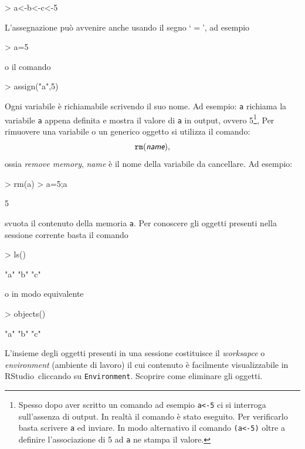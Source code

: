 \documentclass[onecolumn,11pt]{book}
\newcommand{\varia}[1]{\textsl{\textsf{#1}}}
\newcommand{\rst}{\textsf{RStudio}~}
\begin{document}
\begin{Schunk}
\begin{Sinput}
> a<-b<-c<-5 
\end{Sinput}
\end{Schunk}
L'assegnazione pu\`o avvenire anche usando il segno `$=$', ad esempio
\begin{Schunk}
\begin{Sinput}
> a=5 
\end{Sinput}
\end{Schunk}
o il comando
\begin{Schunk}
\begin{Sinput}
> assign("a",5)
\end{Sinput}
\end{Schunk}
Ogni variabile \`e richiamabile scrivendo il suo nome.
Ad esempio:
\texttt{a} richiama la variabile \texttt{a} appena definita e mostra il valore di \texttt{a} in output, ovvero 5\footnote{Spesso 
dopo aver scritto un comando ad esempio \texttt{a<-5} ci si interroga sull'assenza di output. In realt\`a il comando \`e stato eseguito. Per verificarlo basta scrivere \texttt{a} ed inviare. In modo alternativo il comando  \texttt{(a<-5)} oltre a definire l'associazione di 5 ad \texttt{a} ne stampa il valore.},
Per rimuovere una variabile o un generico oggetto si utilizza il comando:
$$\texttt{rm}(\varia{name}),$$
 ossia {\it remove memory}, \varia{name} \`e il nome della variabile da cancellare. Ad  esempio: 
\begin{Schunk}
\begin{Sinput}
> rm(a)
> a=5;a
\end{Sinput}
\begin{Soutput}
[1] 5
\end{Soutput}
\end{Schunk}
svuota il contenuto della memoria \texttt{a}. Per conoscere gli oggetti presenti nella sessione corrente basta il comando
\begin{Schunk}
\begin{Sinput}
> ls()
\end{Sinput}
\begin{Soutput}
[1] "a" "b" "c"
\end{Soutput}
\end{Schunk}
o in modo equivalente
\begin{Schunk}
\begin{Sinput}
> objects()
\end{Sinput}
\begin{Soutput}
[1] "a" "b" "c"
\end{Soutput}
\end{Schunk}
L'insieme degli oggetti presenti in una sessione costituisce il \textsl{worksapce} o \textsl{environment} (ambiente di lavoro) il cui contenuto \`e facilmente visualizzabile in \rst   cliccando su \texttt{Environment}.
Scoprire come eliminare gli oggetti. 
\end{document}
